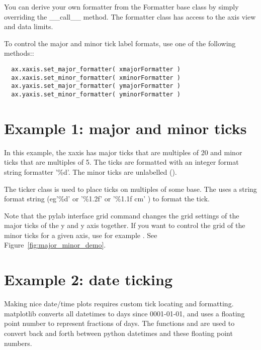 \documentclass[twoside]{book}
\begin{document}
You can derive your own formatter from the Formatter base class by
simply overriding the \_\_call\_\_ method.  The formatter class has
access to the axis view and data limits.

To control the major and minor tick label formats, use one of the
following methods::

\begin{lstlisting}
  ax.xaxis.set_major_formatter( xmajorFormatter )
  ax.xaxis.set_minor_formatter( xminorFormatter )
  ax.yaxis.set_major_formatter( ymajorFormatter )
  ax.yaxis.set_minor_formatter( yminorFormatter )

\end{lstlisting}

\section{Example 1: major and minor ticks}

In this example, the xaxis has major ticks that are multiples of 20
and minor ticks that are multiples of 5.  The ticks are formatted with
an integer format string formatter '\%d'.  The minor ticks are
unlabelled ().

The  ticker class is used to place ticks on
multiples of some base.  The  uses a string format
string (eg'\%d' or '\%1.2f' or '\%1.1f cm' ) to format the tick.

Note that the pylab interface grid command changes the grid settings
of the major ticks of the y and y axis together.  If you want to
control the grid of the minor ticks for a given axis, use for example
.  See
Figure~\ref{fig:major_minor_demo}.





\section{Example 2: date ticking}

Making nice date/time plots requires custom tick locating and
formatting.  matplotlib converts all datetimes to days since
0001-01-01, and uses a floating point number to represent fractions of
days.  The functions  and  are used to
convert back and forth between python datetimes and these floating
point numbers.
\end{document}
